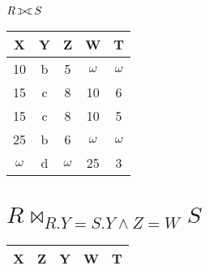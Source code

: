 \documentclass{article}
\def\ojoin{\setbox0=\hbox{$\bowtie$}%
  \rule[-.02ex]{.25em}{.5pt}\llap{\rule[\ht0]{.25em}{.5pt}}}
\def\fullouterjoin{\mathbin{\ojoin\mkern-5.8mu\bowtie\mkern-5.8mu\ojoin}}
\begin{document}
	\section{$R\fullouterjoin S$}
	\begin{center}
	\begin{tabular}{|c|c|c|c|c|}
		\hline
		X & Y & Z & W & T \\
		\hline
		10 & b & 5 & $\omega$ & $\omega$ \\
		15 & c & 8 & 10 & 6 \\
		15 & c & 8 & 10 & 5 \\
		25 & b & 6 & $\omega$ & $\omega$ \\
		$\omega$ & d & $ \omega$ & 25 & 3 \\
		\hline
	\end{tabular}
	\end{center}
	\section{$R\bowtie_{R.Y=S.Y\land Z=W}S$}
	\begin{center}
	\begin{tabular}{|c|c|c|c|c|}
		\hline
		X & Z & Y & W & T \\
		\hline
	\end{tabular}
	\end{center}
\end{document}
